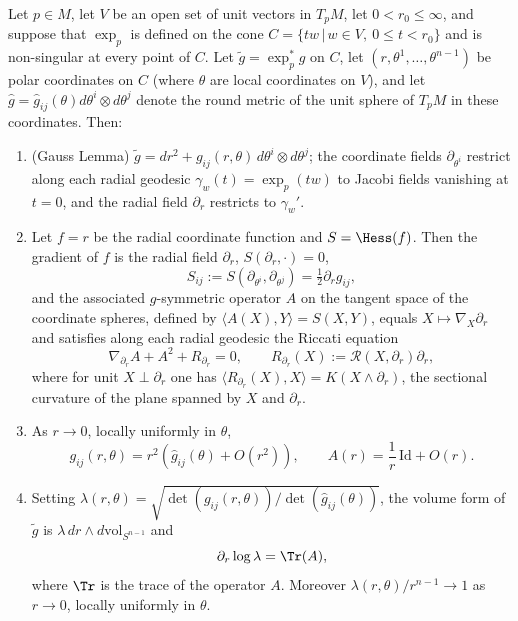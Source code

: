 \begin{lemma}
Let $p\in M$, let $V$ be an open set of unit vectors in $T_pM$, let
$0<r_0\le\infty$, and suppose that $\exp_p$ is defined on the cone
$C=\{tw\,|\,w\in V,\ 0\le t<r_0\}$ and is non-singular at every
point of $C$. Let $\tilde g=\exp_p^*g$ on $C$, let
$(r,\theta^1,\ldots,\theta^{n-1})$ be polar coordinates on $C$
(where $\theta$ are local coordinates on $V$), and let $\hat
g=\hat g_{ij}(\theta)d\theta^i\otimes d\theta^j$ denote the round
metric of the unit sphere of $T_pM$ in these coordinates. Then:
\begin{enumerate}
\item (Gauss Lemma) $\tilde g=dr^2+g_{ij}(r,\theta)\,
d\theta^i\otimes d\theta^j$; the coordinate fields
$\partial_{\theta^i}$ restrict along each radial geodesic
$\gamma_w(t)=\exp_p(tw)$ to Jacobi fields vanishing at $t=0$, and
the radial field $\partial_r$ restricts to $\gamma_w'$.
\item Let $f=r$ be the radial coordinate function and
$S=\Hess(f)$. Then the gradient of $f$ is the radial field
$\partial_r$, $S(\partial_r,\cdot)=0$,
$$S_{ij}:=S(\partial_{\theta^i},\partial_{\theta^j})
=\tfrac{1}{2}\partial_rg_{ij},$$
and the associated $g$-symmetric operator $A$ on the tangent space
of the coordinate spheres, defined by $\langle
A(X),Y\rangle=S(X,Y)$, equals $X\mapsto\nabla_X\partial_r$ and
satisfies along each radial geodesic the Riccati equation
$$\nabla_{\partial_r}A+A^2+R_{\partial_r}=0,\qquad
R_{\partial_r}(X):={\mathcal R}(X,\partial_r)\partial_r,$$
where for unit $X\perp\partial_r$ one has $\langle
R_{\partial_r}(X),X\rangle=K(X\wedge\partial_r)$, the sectional
curvature of the plane spanned by $X$ and $\partial_r$.
\item As $r\to0$, locally uniformly in $\theta$,
$$g_{ij}(r,\theta)=r^2\left(\hat g_{ij}(\theta)+O(r^2)\right),
\qquad A(r)=\frac{1}{r}\,\mathrm{Id}+O(r).$$
\item Setting $\lambda(r,\theta)
=\sqrt{\det\left(g_{ij}(r,\theta)\right)/\det\left(\hat
g_{ij}(\theta)\right)}$, the volume form of $\tilde g$ is
$\lambda\, dr\wedge d\mathrm{vol}_{S^{n-1}}$ and
$$\partial_r\log\lambda=\Tr(A),$$
where $\Tr$ is the trace of the operator $A$. Moreover
$\lambda(r,\theta)/r^{n-1}\to 1$ as $r\to 0$, locally uniformly in
$\theta$.
\end{enumerate}
\end{lemma}

